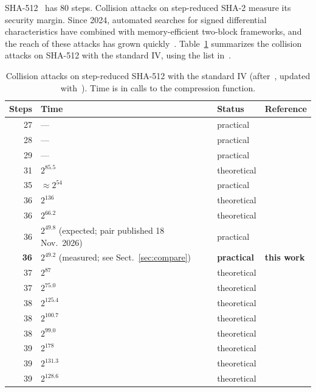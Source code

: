 \documentclass[11pt]{article}
\begin{document}
SHA-512~\cite{FIPS180} has 80 steps. Collision attacks on step-reduced SHA-2 measure its security margin. Since 2024, automated searches for signed differential characteristics have combined with memory-efficient two-block frameworks, and the reach of these attacks has grown quickly~\cite{LLW24a,LLWDS24,LLWQJK25,LLWS26,LZLLQZ26,GWZW26,YY26}. Table~\ref{tab:sota} summarizes the collision attacks on SHA-512 with the standard IV, using the list in~\cite[Table~1]{LZLLQZ26}.

\begin{table}[h]
\centering
\caption{Collision attacks on step-reduced SHA-512 with the standard IV (after~\cite[Table~1]{LZLLQZ26}, updated with~\cite{GWZW26,YY26}). Time is in calls to the compression function.}
\label{tab:sota}
\begin{tabular}{rlll}
\toprule
Steps & Time & Status & Reference \\
\midrule
27 & --- & practical & \cite{DEM15} \\
28 & --- & practical & \cite{LLW24a} \\
29 & --- & practical & \cite{LLWQJK25} \\
31 & $2^{85.5}$ & theoretical & \cite{LLWQJK25} \\
35 & $\approx 2^{54}$ & practical & \cite{LLWS26} \\
36 & $2^{136}$ & theoretical & \cite{LLWS26} \\
36 & $2^{66.2}$ & theoretical & \cite{LZLLQZ26} \\
36 & $2^{49.8}$ (expected; pair published 18 Nov.\ 2026) & practical & \cite{YY26} \\
\textbf{36} & $2^{49.2}$ (measured; see Sect.~\ref{sec:compare}) & \textbf{practical} & \textbf{this work} \\
37 & $2^{87}$ & theoretical & \cite{LZLLQZ26} \\
37 & $2^{75.0}$ & theoretical & \cite{YY26} \\
38 & $2^{125.4}$ & theoretical & \cite{LZLLQZ26} \\
38 & $2^{100.7}$ & theoretical & \cite{GWZW26} \\
38 & $2^{99.0}$ & theoretical & \cite{YY26} \\
39 & $2^{178}$ & theoretical & \cite{LZLLQZ26} \\
39 & $2^{131.3}$ & theoretical & \cite{GWZW26} \\
39 & $2^{128.6}$ & theoretical & \cite{YY26} \\
\bottomrule
\end{tabular}
\end{table}
\end{document}
